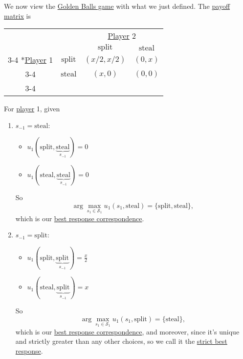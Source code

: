 \begin{prev}
	We now view the \hyperref[eg:golden-ball]{Golden Balls game} with what we just defined. The \hyperref[def:payoff-matrix]{payoff matrix} is
	\begin{table}[H]
		\centering
		\setlength{\extrarowheight}{2pt}
		\begin{tabular}{cc|c|c|}
			                                               & \multicolumn{1}{c}{} & \multicolumn{2}{c}{\hyperref[def:player]{Player} 2}                                      \\
			                                               & \multicolumn{1}{c}{} & \multicolumn{1}{c}{$\text{split}$}                  & \multicolumn{1}{c}{$\text{steal}$} \\\cline{3-4}
			\multirow{2}*{\hyperref[def:player]{Player} 1} & $\text{split}$       & $(x/2, x/2)$                                        & $(0, x)$                           \\\cline{3-4}
			                                               & $\text{steal}$       & $(x, 0)$                                            & $(0, 0)$                           \\\cline{3-4}
		\end{tabular}
	\end{table}

	For \hyperref[def:player]{player} 1, given
	\begin{enumerate}
		\item \(s_{-1} = \text{steal}\):
		      \begin{itemize}
			      \item \(u_1(\text{split} , \underbrace{\text{steal}}_{s_{-1}} ) = 0\)
			      \item \(u_1(\text{steal} , \underbrace{\text{steal}}_{s_{-1}} ) = 0\)
		      \end{itemize}
		      So
		      \[
			      \arg\max_{s_1\in \mathcal{S}_1} u_1(s_1, \text{steal} ) = \{\text{split}, \text{steal}  \},
		      \]
		      which is our \hyperref[def:best-response]{best response correspondence}.
		\item \(s_{-1} = \mathrm{split}\):
		      \begin{itemize}
			      \item \(u_1(\text{split} , \underbrace{\text{split}}_{s_{-1}} ) = \frac{x}{2}\)
			      \item \(u_1(\text{steal} , \underbrace{\text{split}}_{s_{-1}} ) = x\)
		      \end{itemize}
		      So
		      \[
			      \arg\max_{s_1\in \mathcal{S}_1} u_1(s_1, \text{split} ) = \{\text{steal}\},
		      \]
		      which is our \hyperref[def:best-response]{best response correspondence}, and moreover, since it's unique and strictly greater
		      than any other choices, so we call it the \hyperref[def:strict-best-response]{strict best response}.
	\end{enumerate}
\end{prev}

